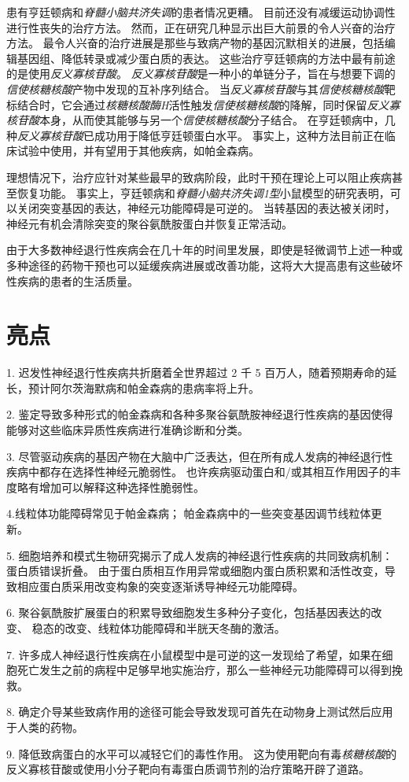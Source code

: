 患有亨廷顿病和\textit{脊髓小脑共济失调}的患者情况更糟。
目前还没有减缓运动协调性进行性丧失的治疗方法。
然而，正在研究几种显示出巨大前景的令人兴奋的治疗方法。
最令人兴奋的治疗进展是那些与致病产物的基因沉默相关的进展，包括编辑基因组、降低转录或减少蛋白质的表达。
这些治疗亨廷顿病的方法中最有前途的是使用\textit{反义寡核苷酸}。
\textit{反义寡核苷酸}是一种小的单链分子，旨在与想要下调的\textit{信使核糖核酸}产物中发现的互补序列结合。
当\textit{反义寡核苷酸}与其\textit{信使核糖核酸}靶标结合时，它会通过\textit{核糖核酸酶H}活性触发\textit{信使核糖核酸}的降解，同时保留\textit{反义寡核苷酸}本身，从而使其能够与另一个\textit{信使核糖核酸}分子结合。
在亨廷顿病中，几种\textit{反义寡核苷酸}已成功用于降低亨廷顿蛋白水平。
事实上，这种方法目前正在临床试验中使用，并有望用于其他疾病，如帕金森病。


理想情况下，治疗应针对某些最早的致病阶段，此时干预在理论上可以阻止疾病甚至恢复功能。
事实上，亨廷顿病和\textit{脊髓小脑共济失调1型}小鼠模型的研究表明，可以关闭突变基因的表达，神经元功能障碍是可逆的。
当转基因的表达被关闭时，神经元有机会清除突变的聚谷氨酰胺蛋白并恢复正常活动。


由于大多数神经退行性疾病会在几十年的时间里发展，即使是轻微调节上述一种或多种途径的药物干预也可以延缓疾病进展或改善功能，这将大大提高患有这些破坏性疾病的患者的生活质量。



\section{亮点}

1. 迟发性神经退行性疾病共折磨着全世界超过 2 千 5 百万人，随着预期寿命的延长，预计阿尔茨海默病和帕金森病的患病率将上升。 


2. 鉴定导致多种形式的帕金森病和各种多聚谷氨酰胺神经退行性疾病的基因使得能够对这些临床异质性疾病进行准确诊断和分类。


3. 尽管驱动疾病的基因产物在大脑中广泛表达，但在所有成人发病的神经退行性疾病中都存在选择性神经元脆弱性。
也许疾病驱动蛋白和/或其相互作用因子的丰度略有增加可以解释这种选择性脆弱性。


4.线粒体功能障碍常见于帕金森病；
帕金森病中的一些突变基因调节线粒体更新。


5. 细胞培养和模式生物研究揭示了成人发病的神经退行性疾病的共同致病机制：蛋白质错误折叠。
由于蛋白质相互作用异常或细胞内蛋白质积累和活性改变，导致相应蛋白质采用改变构象的突变逐渐诱导神经元功能障碍。


6. 聚谷氨酰胺扩展蛋白的积累导致细胞发生多种分子变化，包括基因表达的改变、 稳态的改变、线粒体功能障碍和半胱天冬酶的激活。


7. 许多成人神经退行性疾病在小鼠模型中是可逆的这一发现给了希望，如果在细胞死亡发生之前的病程中足够早地实施治疗，那么一些神经元功能障碍可以得到挽救。


8. 确定介导某些致病作用的途径可能会导致发现可首先在动物身上测试然后应用于人类的药物。


9. 降低致病蛋白的水平可以减轻它们的毒性作用。
这为使用靶向有毒\textit{核糖核酸}的反义寡核苷酸或使用小分子靶向有毒蛋白质调节剂的治疗策略开辟了道路。

